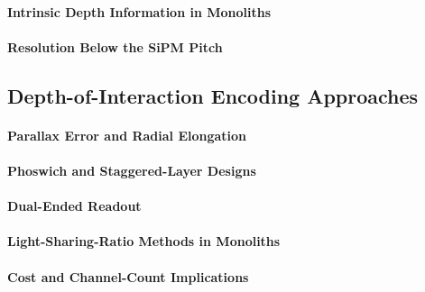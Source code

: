 \paragraph{Intrinsic Depth Information in Monoliths}

\paragraph{Resolution Below the SiPM Pitch}

\subsection{Depth-of-Interaction Encoding Approaches}
\label{sec:doi}

\paragraph{Parallax Error and Radial Elongation}

\paragraph{Phoswich and Staggered-Layer Designs}

\paragraph{Dual-Ended Readout}

\paragraph{Light-Sharing-Ratio Methods in Monoliths}

\paragraph{Cost and Channel-Count Implications}

